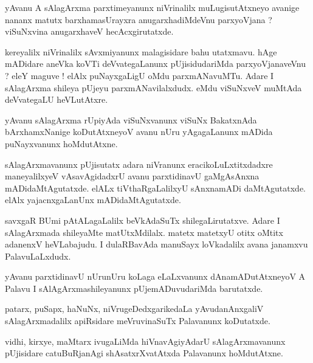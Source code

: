 \documentclass{article}
\begin{document}
\begin{mn}%
yAvanu A sAlagArxma parxtimeyanunx niVrinalilx muLugisutAtxneyo avanige nananx matutx 
barxhamasUrayxra anugarxhadiMdeVnu parxyoVjana ? viSuNxvina anugarxhaveV hecAcxgirutatxde.
\end{mn}

\begin{mn}%
kereyalilx niVrinalilx sAvxmiyanunx malagisidare bahu utatxmavu. hAge mADidare aneVka koVTi 
deVvategaLanunx pUjisidudariMda parxyoVjanaveVnu ? eleY maguve ! elAlx puNayxgaLigU oMdu 
parxmANavuMTu. Adare I sAlagArxma shileya pUjeyu parxmANavilalxdudx. eMdu viSuNxveV muMtAda 
deVvategaLU heVLutAtxre.
\end{mn}

\begin{mn}%
yAvanu sAlagArxma rUpiyAda viSuNxvanunx viSuNx BakatxnAda bArxhamxNanige koDutAtxneyoV avanu nUru 
yAgagaLanunx mADida puNayxvanunx hoMdutAtxne.
\end{mn}

\begin{mn}%
sAlagArxmavanunx pUjisutatx adara niVranunx eracikoLuLxtitxdadxre maneyalilxyeV vAsavAgidadxrU 
avanu parxtidinavU gaMgAsAnxna mADidaMtAgutatxde. elALx tiVthaRgaLalilxyU sAnxnamADi 
daMtAgutatxde. elAlx yajacnxgaLanUnx mADidaMtAgutatxde.
\end{mn}

\begin{mn}%
savxgaR BUmi pAtALagaLalilx beVkAdaSuTx shilegaLirutatxve. Adare I sAlagArxmada shileyaMte 
matUtxMdilalx. matetx matetxyU otitx oMtitx adanenxV heVLabajudu. I dulaRBavAda manuSayx 
loVkadalilx avana janamxvu PalavuLaLxdudx.
\end{mn}

\begin{mn}%
yAvanu parxtidinavU nUrunUru koLaga eLaLxvanunx dAnamADutAtxneyoV A Palavu I sAlAgArxmashileyanunx 
pUjemADuvudariMda barutatxde.
\end{mn}

\begin{mn}%
patarx, puSapx, haNuNx, niVrugeDedxgarikedaLa yAvudanAnxgaliV sAlagArxmadalilx apiRsidare 
meVruvinaSuTx Palavanunx koDutatxde.
\end{mn}

\begin{mn}%
vidhi, kirxye, maMtarx ivugaLiMda hiVnavAgiyAdarU sAlagArxmavanunx pUjisidare catuBuRjanAgi 
shAsatxrXvatAtxda Palavanunx hoMdutAtxne.
\end{mn}
\end{document}
